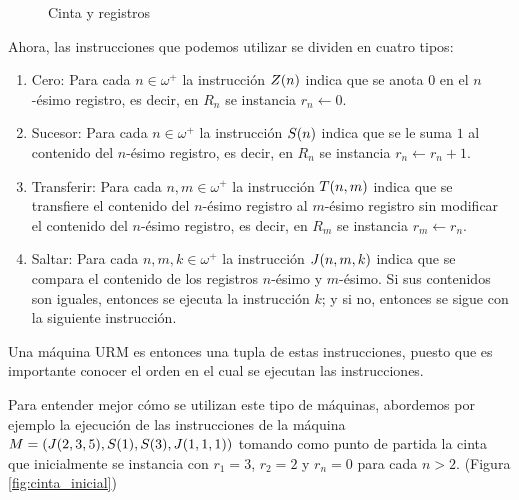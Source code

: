 \begin{figure}[h!]
	\centering


	\caption{Cinta y registros}
	\label{fig: cinta_y_registros}
\end{figure}

Ahora, las instrucciones que podemos utilizar se dividen en cuatro tipos:

\begin{enumerate}
	\item Cero: Para cada $n\in\omega^{+}$ la instrucción $Z\pa*{n}$ indica que se anota $0$ en el $n$-ésimo registro, es decir, en $R_{n}$ se instancia $r_{n}\gets 0$.
	\item Sucesor: Para cada $n\in\omega^{+}$ la instrucción $S\pa*{n}$ indica que se le suma $1$ al contenido del $n$-ésimo registro, es decir, en $R_{n}$ se instancia $r_{n}\gets r_{n} + 1$.
	\item Transferir: Para cada $n, m\in\omega^{+}$ la instrucción $T\pa*{n, m}$ indica que se transfiere el contenido del $n$-ésimo registro al $m$-ésimo registro sin modificar el contenido del $n$-ésimo registro, es decir, en $R_{m}$ se instancia $r_{m}\gets r_{n}$.
	\item Saltar: Para cada $n, m, k\in\omega^{+}$ la instrucción $J\pa*{n, m, k}$ indica que se compara el contenido de los registros $n$-ésimo y $m$-ésimo. Si sus contenidos son iguales, entonces se ejecuta la instrucción $k$; y si no, entonces se sigue con la siguiente instrucción.
\end{enumerate}

Una máquina URM es entonces una tupla de estas instrucciones, puesto que es importante conocer el orden en el cual se ejecutan las instrucciones.

Para entender mejor cómo se utilizan este tipo de máquinas, abordemos por ejemplo la ejecución de las instrucciones de la máquina $M =\pa*{J\pa*{2, 3, 5},S\pa*{1}, S\pa*{3},  J\pa*{1, 1, 1}}$ tomando como punto de partida la cinta que inicialmente se instancia con $r_{1} = 3$, $r_{2} = 2$ y $r_{n} = 0$ para cada $n > 2$. (Figura \ref{fig:cinta_inicial})

